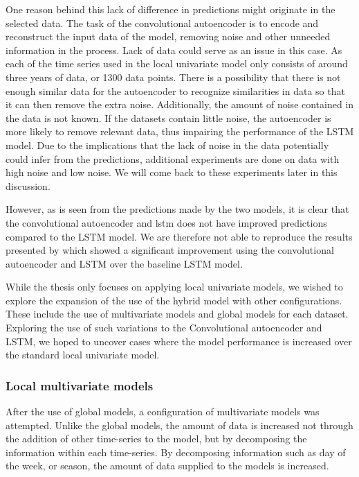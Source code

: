 One reason behind this lack of difference in predictions might originate in the selected data.
The task of the convolutional autoencoder is to encode and reconstruct the input data of the model,
removing noise and other unneeded information in the process.
Lack of data could serve as an issue in this case.
As each of the time series used in the local univariate model only consists of around three years of data, or 1300 data points.
There is a possibility that there is not enough similar data for the autoencoder to recognize similarities in data
so that it can then remove the extra noise.
Additionally, the amount of noise contained in the data is not known.
If the datasets contain little noise, the autoencoder is more likely to remove relevant data, thus impairing the performance of the LSTM model.
Due to the implications that the lack of noise in the data potentially could infer from the predictions,
additional experiments are done on data with high noise and low noise.
We will come back to these experiments later in this discussion.

However, as is seen from the predictions made by the two models, it is clear that the convolutional autoencoder and lstm
does not have improved predictions compared to the LSTM model.
We are therefore not able to reproduce the results presented by \cite{Zhao2019}
which showed a significant improvement using the convolutional autoencoder and LSTM over the baseline LSTM model.


While the thesis \cite{Zhao2019} only focuses on applying local univariate models,
we wished to explore the expansion of the use of the hybrid model with other configurations.
These include the use of multivariate models and global models for each dataset.
Exploring the use of such variations to the Convolutional autoencoder and LSTM,
we hoped to uncover cases where the model performance is increased over the standard local univariate model.










\subsubsection{Local multivariate models}

After the use of global models, a configuration of multivariate models was attempted.
Unlike the global models, the amount of data is increased not through the addition of other time-series to the model,
but by decomposing the information within each time-series.
By decomposing information such as day of the week, or season, the amount of data supplied to the models is increased.


